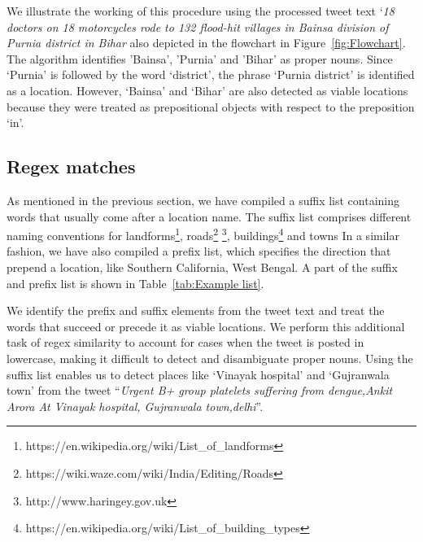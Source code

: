 We illustrate the working of this procedure using the processed tweet text `\textit{18 doctors on 18 motorcycles rode to 132 flood-hit villages in Bainsa division of Purnia district in Bihar} also depicted in the flowchart in 
Figure~\ref{fig:Flowchart}. 
The algorithm identifies 'Bainsa', 'Purnia' and 'Bihar' as proper nouns. Since `Purnia' is followed by the word `district', the phrase `Purnia district' is identified as a location. However, `Bainsa' and `Bihar' are also detected as viable locations because they were treated as prepositional objects with respect to the preposition `in'. 



\subsection{Regex matches}

As mentioned in the previous section, we have compiled a suffix list 
containing words that usually come after a location name. 
The suffix list comprises different naming conventions for
landforms\footnote{https://en.wikipedia.org/wiki/List\_of\_landforms}, 
roads\footnote{https://wiki.waze.com/wiki/India/Editing/Roads} \footnote{http://www.haringey.gov.uk}, 
buildings\footnote{https://en.wikipedia.org/wiki/List\_of\_building\_types} and towns 
In a similar fashion, we have also compiled a prefix list, which specifies the direction that prepend a location, like Southern California, West Bengal.
A part of the suffix and prefix list is shown in Table~\ref{tab:Example list}.

We identify the prefix and suffix elements from the tweet text and treat the words that succeed or precede it as viable locations.
We perform this additional task of regex similarity to account for cases when the tweet is posted in lowercase, making it difficult to detect and disambiguate proper nouns.
Using the suffix list enables us 
to detect places like `Vinayak hospital' and `Gujranwala town' from the tweet ``\textit{Urgent B+ group platelets suffering from dengue,Ankit Arora  At Vinayak hospital, Gujranwala town,delhi}''.

